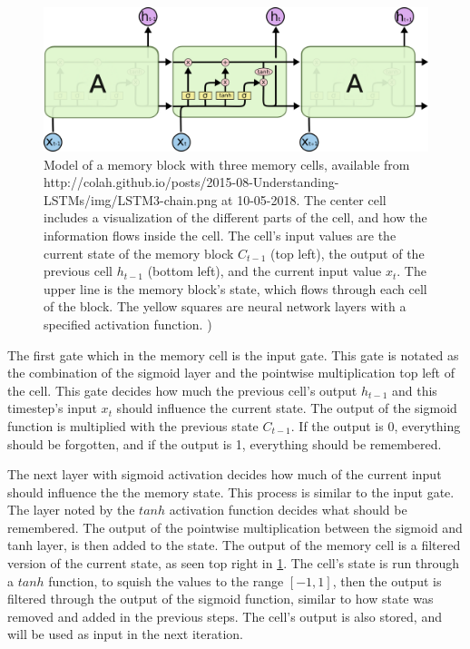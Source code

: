 \begin{figure}[H]
    \centering
    \includegraphics[width=\textwidth]{Assets/Chapter2_Theory/LSTM3-chain.png}
    \caption{Model of a memory block with three memory cells, available from http://colah.github.io/posts/2015-08-Understanding-LSTMs/img/LSTM3-chain.png at 10-05-2018. The center cell includes a visualization of the different parts of the cell, and how the information flows inside the cell. The cell's input values are the current state of the memory block $C_{t-1}$ (top left), the output of the previous cell $h_{t-1}$ (bottom left), and  the current input value $x_t$. The upper line is the memory block's state, which flows through each cell of the block. The yellow squares are neural network layers with a specified activation function. \cite{_understanding_2015})}
    \label{fig:lstm_cells}
\end{figure}

The first gate which in the memory cell is the input gate. This gate is notated as the combination of the sigmoid layer and the pointwise multiplication top left of the cell. This gate decides how much the previous cell's output $h_{t-1}$ and this timestep's input $x_t$ should influence the current state. The output of the sigmoid function is multiplied with the previous state $C_{t-1}$. If the output is 0, everything should be forgotten, and if the output is 1, everything should be remembered. 

The next layer with sigmoid activation decides how much of the current input should influence the the memory state. This process is similar to the input gate. The layer noted by the $tanh$ activation function decides what should be remembered. The output of the pointwise multiplication between the sigmoid and tanh layer, is then added to the state.
The output of the memory cell is a filtered version of the current state, as seen top right in \ref{fig:lstm_cells}. The cell's state is run through a $tanh$ function, to squish the values to the range $[-1, 1]$, then the output is filtered through the output of the sigmoid function, similar to how state was removed and added in the previous steps. The cell's output is also stored, and will be used as input in the next iteration. 

